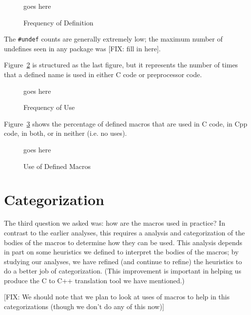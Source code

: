 \begin{figure}
goes here

\caption{Frequency of Definition\label{fig:define_count}}
\end{figure}

The \verb+#undef+ counts are generally extremely low; the maximum
number of undefines seen in any package was [FIX: fill in here].

Figure~\ref{fig:use_count} is structured as the last figure, but it
represents the number of times that a defined name is used in either C
code or preprocessor code.

\begin{figure}
goes here

\caption{Frequency of Use\label{fig:use_count}}
\end{figure}

Figure~\ref{fig:define_usage} shows the percentage of defined macros
that are used in C code, in Cpp code, in both, or in neither (i.e. no
uses).

\begin{figure}
goes here

\caption{Use of Defined Macros\label{fig:define_usage}}
\end{figure}


\section{Categorization}\label{sec:categorization}

The third question we asked was: how are the macros used in practice?
In contrast to the earlier analyses, this requires a analysis and
categorization of the bodies of the macros to determine how they can
be used.  This analysis depends in part on some heuristics we defined
to interpret the bodies of the macros; by studying our analyses, we
have refined (and continue to refine) the heuristics to do a better
job of categorization.  (This improvement is important in helping us
produce the C to C++ translation tool we have mentioned.)

[FIX: We should note that we plan to look at uses of macros to help in
this categorizations (though we don't do any of this now)]

